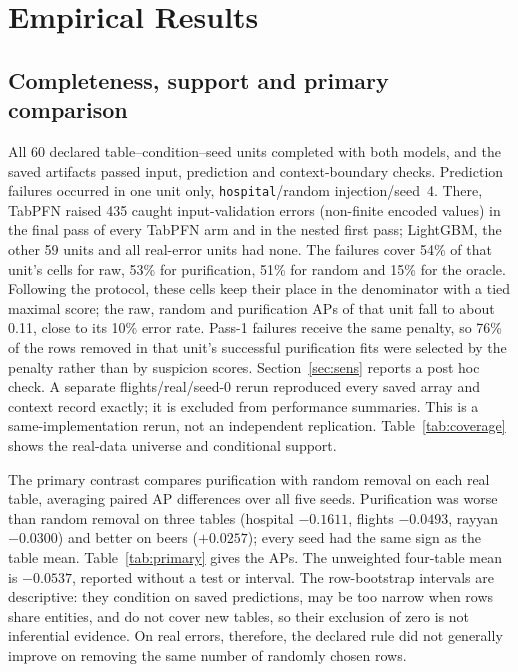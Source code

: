 \section{Empirical Results}
\subsection{Completeness, support and primary comparison}
All 60 declared table--condition--seed units completed with both models, and the
saved artifacts passed input, prediction and context-boundary checks. Prediction
failures occurred in one unit only, \texttt{hospital}/random injection/seed~4.
There, TabPFN raised 435 caught input-validation errors (non-finite encoded values)
in the final pass of every TabPFN arm and in the nested first pass; LightGBM, the
other 59 units and all real-error units had none. The failures cover 54\% of that
unit's cells for raw, 53\% for purification, 51\% for random and 15\% for the oracle.
Following the protocol, these cells keep their place in the denominator with a tied
maximal score; the raw, random and purification APs of that unit fall to about 0.11,
close to its 10\% error rate. Pass-1 failures receive the same penalty, so 76\% of the
rows removed in that unit's successful purification fits were selected by the penalty
rather than by suspicion scores. Section~\ref{sec:sens} reports a post hoc check.
A separate flights/real/seed-0 rerun reproduced every saved array and context record
exactly; it is excluded from performance summaries. This is a same-implementation
rerun, not an independent replication.
Table~\ref{tab:coverage} shows the real-data universe and conditional support.


The primary contrast compares purification with random removal on each real table,
averaging paired AP differences over all five seeds. Purification was worse than
random removal on three tables (hospital $-0.1611$, flights $-0.0493$, rayyan $-0.0300$)
and better on beers ($+0.0257$); every seed had the same sign as the table mean.
Table~\ref{tab:primary} gives the APs. The unweighted four-table mean is $-0.0537$,
reported without a test or interval. The row-bootstrap intervals are descriptive: they
condition on saved predictions, may be too narrow when rows share entities, and do
not cover new tables, so their exclusion of zero is not inferential evidence.
On real errors, therefore, the declared rule did not generally improve on removing
the same number of randomly chosen rows.



